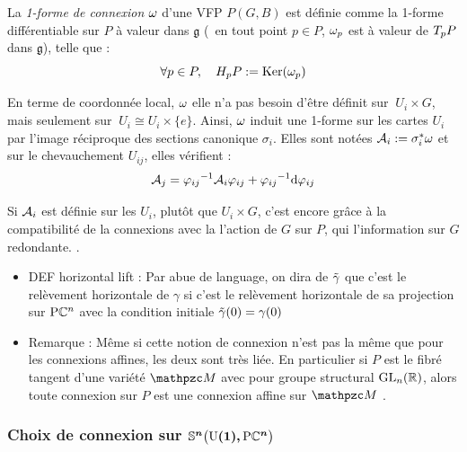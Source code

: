 \begin{definition}
	La \emph{1-forme de connexion} $\conn$ d'une VFP $P(G,B)$ est définie comme la 1-forme différentiable sur $P$ à valeur dans $\mathfrak{g}$ (\ie~en tout point $p\in P$, $\conn_p$ est à valeur de $\tg[p]{P}$ dans $\mathfrak{g}$), telle que :
	\begin{equation} \label{eq:1-form2conn}
		\forall p\in P,\quad \hg[p]{P} \defeq \Ker(\conn_p)
	\end{equation}
	\skipl
	
	En terme de coordonnée local, $\conn$ elle n'a pas besoin d'être définit sur $\ U_i\times G$, mais seulement sur $\ U_i \cong U_i \times \{e\}$. Ainsi, $\conn$ induit une 1-forme sur les cartes $U_i$ par l'image réciproque des sections canonique $\sigma_i$. Elles sont notées $\locconn_i \defeq \sigma_i^*\conn$ et sur le chevauchement $U_{ij}$, elles vérifient :
	\begin{equation}\label{eq:conn_local}
		\locconn_j = {\varphi_{ij}}^{-1} \locconn_i \varphi_{ij} + {\varphi_{ij}}^{-1} \d \varphi_{ij}
	\end{equation}
\end{definition}
\skipl

Si $\locconn_i$ est définie sur les $U_i$, plutôt que $U_i\times G$, c'est encore  grâce à la compatibilité de la connexions avec la l'action de $G$ sur $P$, qui l'information sur $G$ redondante. . 
\\

\begin{itemize}
	
	\item DEF horizontal lift : Par abue de language, on dira de $\Tilde{\gamma}$ que c'est le relèvement horizontale de $\gamma$ si c'est le relèvement horizontale de sa projection sur $\PC{n}$ avec la condition initiale $\Tilde{\gamma}(0) = \gamma(0)$
	
	\item Remarque : Même si cette notion de connexion n'est pas la même que pour les connexions affines, les deux sont très liée. En particulier si $P$ est le fibré tangent d'une variété $\manu$ avec pour groupe structural $\GL_n(\R)$, alors toute connexion sur $P$ est une connexion affine sur $\manu$ .
\end{itemize}



\subsubsection{Choix de connexion sur $\bf{\VFP}$}\label{subsec:conn2SUPC}

